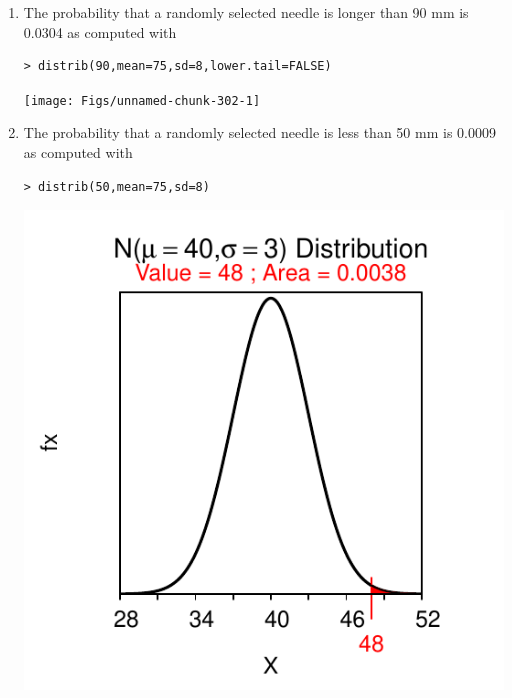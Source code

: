 \documentclass[10pt,openany]{book}\usepackage[]{graphicx}\usepackage[]{color}
\makeatletter
\newenvironment{kframe}{%
 \def\at@end@of@kframe{}%
 \ifinner\ifhmode%
  \def\at@end@of@kframe{\end{minipage}}%
  \begin{minipage}{\columnwidth}%
 \fi\fi%
 \def\FrameCommand##1{\hskip\@totalleftmargin \hskip-\fboxsep
 \colorbox{shadecolor}{##1}\hskip-\fboxsep
     \hskip-\linewidth \hskip-\@totalleftmargin \hskip\columnwidth}%
 \MakeFramed {\advance\hsize-\width
   \@totalleftmargin\z@ \linewidth\hsize
   \@setminipage}}%
 {\par\unskip\endMakeFramed%
 \at@end@of@kframe}
\newenvironment{knitrout}{}{} %
\makeatother
\begin{document}
\begin{itemize}
\begin{enumerate}
\begin{knitrout}
{}



\end{knitrout}
    \item The probability that a randomly selected needle is longer than 90 mm is 0.0304 as computed with
\begin{knitrout}
\color{fgcolor}\begin{kframe}
\begin{verbatim}
> distrib(90,mean=75,sd=8,lower.tail=FALSE)
\end{verbatim}
\end{kframe}

{\centering \texttt{[image: Figs/unnamed-chunk-302-1]} 

}



\end{knitrout}
    \item The probability that a randomly selected needle is less than 50 mm is 0.0009 as computed with
\begin{knitrout}
\color{fgcolor}\begin{kframe}
\begin{verbatim}
> distrib(50,mean=75,sd=8)
\end{verbatim}
\end{kframe}

{\centering \includegraphics[width=.4\linewidth]{Figs/unnamed-chunk-303-1} 

}



\end{knitrout}
  \end{enumerate}

\end{itemize}





\end{document}
